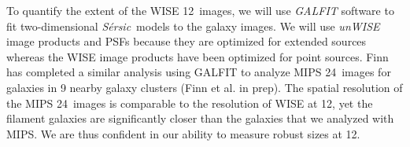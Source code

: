 \documentclass[11pt, preprint]{aastex}
\newcommand{\sers}{{\it S\'{e}rsic}}
\begin{document}
{To quantify the extent of the WISE 12\micron \ images, 
we will use  {\it GALFIT} software \citep{peng02}
to fit two-dimensional \sers \ models to the galaxy images.  We will use {\it unWISE} image products and PSFs \citep{lang14}
because they are optimized for extended sources whereas the WISE
image products have been optimized for point sources.
Finn has completed a similar analysis using GALFIT to analyze MIPS
24\micron \ images for galaxies in 9 nearby galaxy clusters (Finn et al. in prep).  The
spatial resolution of the MIPS 24\micron \ images is comparable to the
resolution of WISE at 12\micron, yet the filament galaxies are
significantly closer than the galaxies that we analyzed with MIPS.
We are thus confident in our ability to measure robust sizes at 12\micron.  








}
\end{document}
